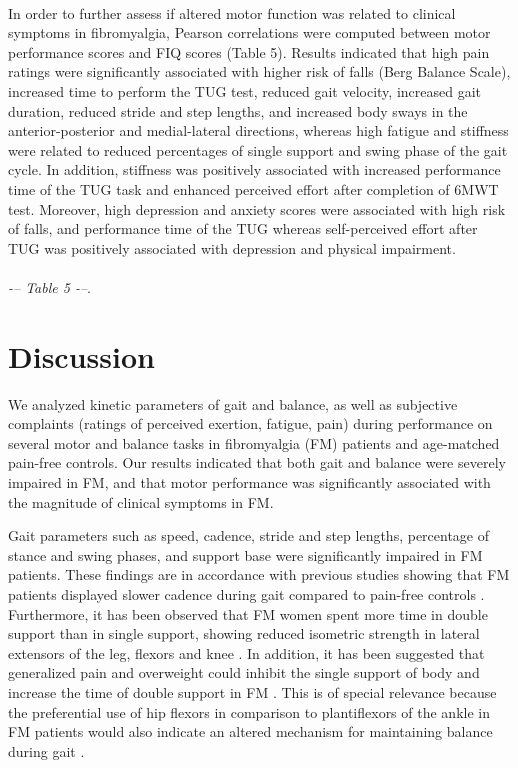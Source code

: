 \documentclass[12pt]{article}
\begin{document}
\\
In order to further assess if altered motor function was related to clinical symptoms in fibromyalgia, Pearson correlations were computed between motor performance scores and FIQ scores (Table 5). Results indicated that high pain ratings were significantly associated with higher risk of falls (Berg Balance Scale), increased time to perform the TUG test, reduced gait velocity, increased gait duration, reduced stride and step lengths, and increased body sways in the anterior-posterior and medial-lateral directions, whereas high fatigue and stiffness were related to reduced percentages of single support and swing phase of the gait cycle. In addition, stiffness was positively associated with increased performance time of the TUG task and enhanced perceived effort after completion of 6MWT test. Moreover, high depression and anxiety scores were associated with high risk of falls, and performance time of the TUG whereas self-perceived effort after TUG was positively associated with depression and physical impairment.\\
\\\emph{-– Table 5 -–}. 

\section*{Discussion}
We analyzed kinetic parameters of gait and balance, as well as subjective complaints (ratings of perceived exertion, fatigue, pain) during performance on several motor and balance tasks in fibromyalgia (FM) patients and age-matched pain-free controls. Our results indicated that both gait and balance were severely impaired in FM, and that motor performance was significantly associated with the magnitude of clinical symptoms in FM.

Gait parameters such as speed, cadence, stride and step lengths, percentage of stance and swing phases, and support base were significantly impaired in FM patients. These findings are in accordance with previous studies showing that FM patients displayed slower cadence during gait compared to pain-free controls \cite{auvinet2006gait,pankoff2000validity, jimenez2009spatial}. Furthermore, it has been observed that FM women spent more time in double support than in single support, showing reduced isometric strength in lateral extensors of the leg, flexors and knee \cite{jimenez2009spatial, cherry2012positive}. In addition, it has been suggested that generalized pain and overweight could inhibit the single support of body and increase the time of double support in FM \cite{jimenez2009spatial, cherry2012positive}. This is of special relevance because the preferential use of hip flexors in comparison to plantiflexors of the ankle in FM patients would also indicate an altered mechanism for maintaining balance during gait \cite{pierrynowski2005women, valkeinen2008physical, winter1995human}.
\end{document}
